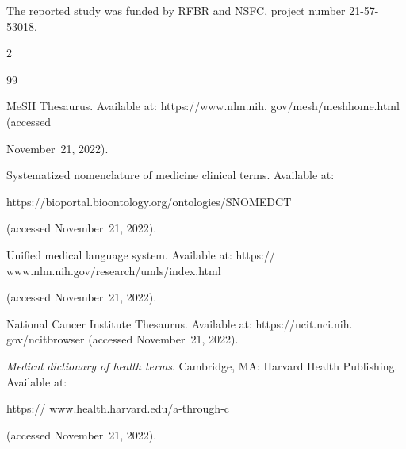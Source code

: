  \Ack

\noindent

The reported study was funded by RFBR and NSFC, project number 21-57-53018.





\vspace*{5pt}



  \begin{multicols}{2}



\renewcommand{\bibname}{\protect\rmfamily References}




{\small\frenchspacing

 {%


 \begin{thebibliography}{99}


MeSH Thesaurus. Available at: {\sf https://www.nlm.nih. gov/mesh/meshhome.html} (accessed 

November~21, 2022). 


Systematized nomenclature of medicine clinical terms. Available at: {\sf 

https://bioportal.bioontology.\linebreak org/ontologies/SNOMEDCT} (accessed November~21, 2022).


Unified medical language system. Available at: {\sf https:// www.nlm.nih.gov/research/umls/index.html} 

(accessed November~21, 2022).


National Cancer Institute Thesaurus. Available at: {\sf https://ncit.nci.nih. gov/ncitbrowser} (accessed November~21, 2022).


\textit{Medical dictionary of health terms}. Cambridge, MA: Harvard Health Publishing. Available at: {\sf  

https:// www.health.harvard.edu/a-through-c} (accessed November~21, 2022).



\end{thebibliography}}}
\end{multicols}
